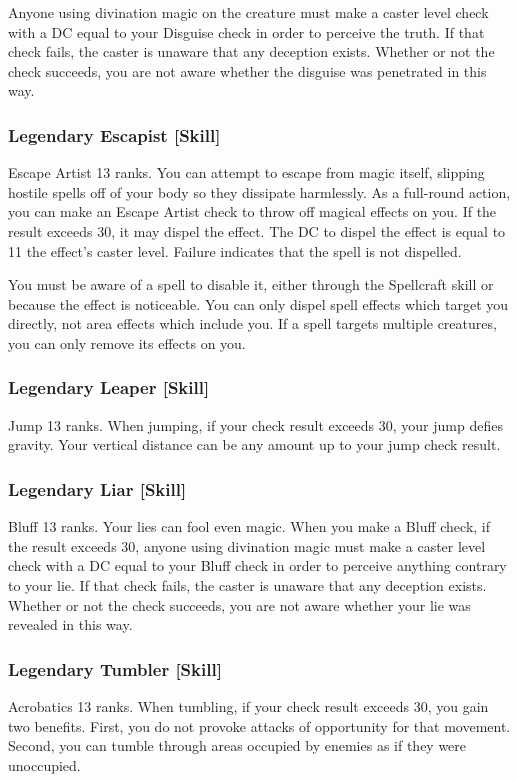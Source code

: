 Anyone using divination magic on the creature must make a caster level check with a DC equal to your Disguise check in order to perceive the truth. If that check fails, the caster is unaware that any deception exists. Whether or not the check succeeds, you are not aware whether the disguise was penetrated in this way.

\subsubsection{Legendary Escapist [Skill]}
\featpre Escape Artist 13 ranks.
\featben You can attempt to escape from magic itself, slipping hostile spells off of your body so they dissipate harmlessly. As a full-round action, you can make an Escape Artist check to throw off magical effects on you. If the result exceeds 30, it may dispel the effect. The DC to dispel the effect is equal to 11 \add the effect's caster level. Failure indicates that the spell is not dispelled.

You must be aware of a spell to disable it, either through the Spellcraft skill or because the effect is noticeable. You can only dispel spell effects which target you directly, not area effects which include you. If a spell targets multiple creatures, you can only remove its effects on you.

\subsubsection{Legendary Leaper [Skill]}
\featpre Jump 13 ranks.
\featben When jumping, if your check result exceeds 30, your jump defies gravity. Your vertical distance can be any amount up to your jump check result. 

\subsubsection{Legendary Liar [Skill]}
\featpre Bluff 13 ranks.
\featben Your lies can fool even magic. When you make a Bluff check, if the result exceeds 30, anyone using divination magic must make a caster level check with a DC equal to your Bluff check in order to perceive anything contrary to your lie. If that check fails, the caster is unaware that any deception exists. Whether or not the check succeeds, you are not aware whether your lie was revealed in this way.

\subsubsection{Legendary Tumbler [Skill]}
\featpre Acrobatics 13 ranks.
\featben When tumbling, if your check result exceeds 30, you gain two benefits. First, you do not provoke attacks of opportunity for that movement. Second, you can tumble through areas occupied by enemies as if they were unoccupied.


